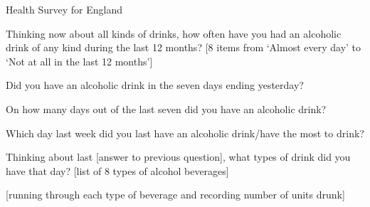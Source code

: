 \documentclass[]{article}
\begin{document}
Health Survey for England

Thinking now about all kinds of drinks, how often have you had an
alcoholic drink of any kind during the last 12 months? {[}8 items from
`Almost every day' to `Not at all in the last 12 months'{]}

Did you have an alcoholic drink in the seven days ending yesterday?

On how many days out of the last seven did you have an alcoholic drink?

Which day last week did you last have an alcoholic drink/have the most
to drink?

Thinking about last {[}answer to previous question{]}, what types of
drink did you have that day? {[}list of 8 types of alcohol beverages{]}

{[}running through each type of beverage and recording number of units
drunk{]}

\renewcommand\refname{References}


\end{document}
